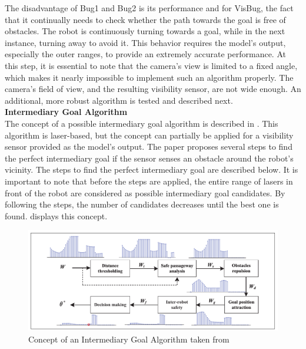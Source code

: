 The disadvantage of Bug1 and Bug2 is its performance and for VisBug, the fact that it continually needs to check whether the path towards the goal is free of obstacles. The robot is continuously turning towards a goal, while in the next instance, turning away to avoid it. This behavior requires the model's output, especially the outer ranges, to provide an extremely accurate performance. At this step, it is essential to note that the camera's view is limited to a fixed angle, which makes it nearly impossible to implement such an algorithm properly. The camera's field of view, and the resulting visibility sensor, are not wide enough. An additional, more robust algorithm is tested and described next.\\

\textbf{Intermediary Goal Algorithm}\\
The concept of a possible intermediary goal algorithm is described in \cite{doi:10.1177/1729881418759107}. This algorithm is laser-based, but the concept can partially be applied for a visibility sensor provided as the model's output. The paper proposes several steps to find the perfect intermediary goal if the sensor senses an obstacle around the robot's vicinity. The steps to find the perfect intermediary goal are described below. It is important to note that before the steps are applied, the entire range of lasers in front of the robot are considered as possible intermediary goal candidates. By following the steps, the number of candidates decreases until the best one is found.  displays this concept.

\begin{figure}[h]%
\centering
\includegraphics[width=1\textwidth]{Bilder/laser_based.png} 
\caption[]{Concept of an Intermediary Goal Algorithm taken from \cite{doi:10.1177/1729881418759107}}
\label{laser_based}
\end{figure}

